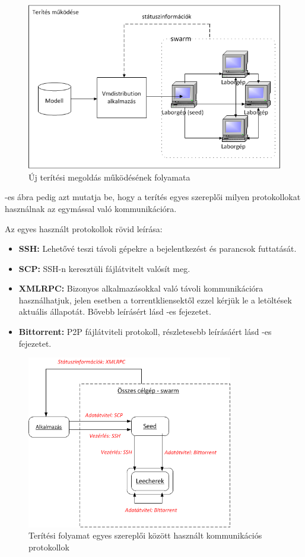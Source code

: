 \begin{figure}[ht]
	\centering
	\includegraphics[width=115mm, keepaspectratio]{figures/design_overview.png}
	\caption{Új terítési megoldás működésének folyamata}
	\label{fig:designoverview}
\end{figure}

-es ábra pedig azt mutatja be, hogy a terítés egyes szereplői milyen protokollokat használnak az egymással való kommunikációra.

Az egyes használt protokollok rövid leírása:

\begin{itemize}
  \item \textbf{SSH}\cite{ylonen2006secure}\textbf{:} Lehetővé teszi távoli gépekre a bejelentkezést és parancsok futtatását.
  \item \textbf{SCP}\cite{pechanec2007scp}\textbf{:} SSH-n keresztüli fájlátvitelt  valósít meg.
  \item \textbf{XMLRPC:} Bizonyos alkalmazásokkal való távoli kommunikációra használhatjuk, jelen esetben a torrentkliensektől ezzel kérjük le a letöltések aktuális állapotát. Bővebb leírásért lásd -es fejezetet.
  \item \textbf{Bittorrent:} P2P fájlátviteli protokoll, részletesebb leírásáért lásd -es fejezetet.
\end{itemize}

\begin{figure}[ht]
	\centering
	\includegraphics[width=90mm, keepaspectratio]{figures/design_protocols.png}
	\caption{Terítési folyamat egyes szereplői között használt kommunikációs protokollok}
	\label{fig:designprotocols}
\end{figure}

